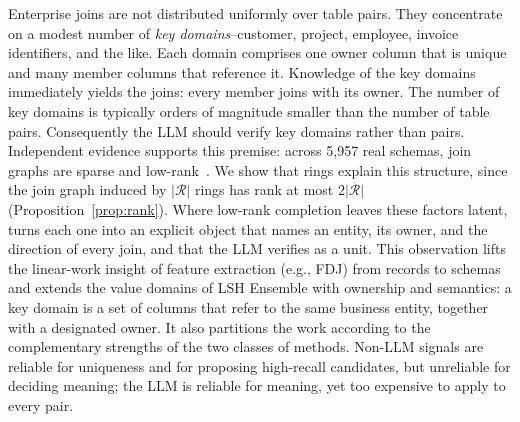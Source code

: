 Enterprise joins are not distributed uniformly over table pairs. They concentrate on a modest number of \emph{key domains}--customer, project, employee, invoice identifiers, and the like. Each domain comprises one owner column that is unique and many member columns that reference it. Knowledge of the key domains immediately yields the joins: every member joins with its owner. The number of key domains is typically orders of magnitude smaller than the number of table pairs. Consequently the LLM should verify key domains rather than pairs. Independent evidence supports this premise: across 5,957 real schemas, join graphs are sparse and low-rank~\cite{Nexus}. We show that rings explain this structure, since the join graph induced by $|\mathcal{R}|$ rings has rank at most $2|\mathcal{R}|$ (Proposition~\ref{prop:rank}). Where low-rank completion leaves these factors latent, \ourmethod turns each one into an explicit object that names an entity, its owner, and the direction of every join, and that the LLM verifies as a unit. This observation lifts the linear-work insight of feature extraction (e.g., FDJ) from records to schemas and extends the value domains of LSH Ensemble with ownership and semantics: a key domain is a set of columns that refer to the same business entity, together with a designated owner. It also partitions the work according to the complementary strengths of the two classes of methods. Non-LLM signals are reliable for uniqueness and for proposing high-recall candidates, but unreliable for deciding meaning; the LLM is reliable for meaning, yet too expensive to apply to every pair.

